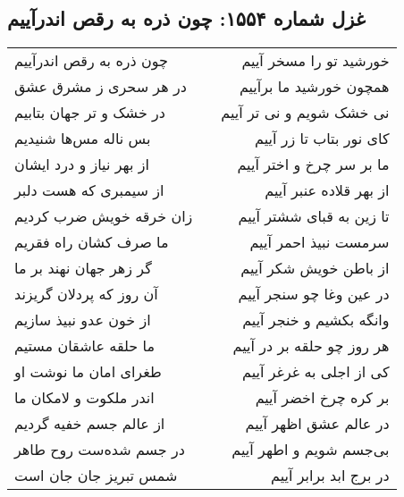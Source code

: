\begin{center}
\section*{غزل شماره ۱۵۵۴: چون ذره به رقص اندرآییم}
\label{sec:1554}
\begin{longtable}{l p{0.5cm} r}
چون ذره به رقص اندرآییم
&&
خورشید تو را مسخر آییم
\\
در هر سحری ز مشرق عشق
&&
همچون خورشید ما برآییم
\\
در خشک و تر جهان بتابیم
&&
نی خشک شویم و نی تر آییم
\\
بس ناله مس‌ها شنیدیم
&&
کای نور بتاب تا زر آییم
\\
از بهر نیاز و درد ایشان
&&
ما بر سر چرخ و اختر آییم
\\
از سیمبری که هست دلبر
&&
از بهر قلاده عنبر آییم
\\
زان خرقه خویش ضرب کردیم
&&
تا زین به قبای ششتر آییم
\\
ما صرف کشان راه فقریم
&&
سرمست نبیذ احمر آییم
\\
گر زهر جهان نهند بر ما
&&
از باطن خویش شکر آییم
\\
آن روز که پردلان گریزند
&&
در عین وغا چو سنجر آییم
\\
از خون عدو نبیذ سازیم
&&
وانگه بکشیم و خنجر آییم
\\
ما حلقه عاشقان مستیم
&&
هر روز چو حلقه بر در آییم
\\
طغرای امان ما نوشت او
&&
کی از اجلی به غرغر آییم
\\
اندر ملکوت و لامکان ما
&&
بر کره چرخ اخضر آییم
\\
از عالم جسم خفیه گردیم
&&
در عالم عشق اظهر آییم
\\
در جسم شده‌ست روح طاهر
&&
بی‌جسم شویم و اطهر آییم
\\
شمس تبریز جان جان است
&&
در برج ابد برابر آییم
\\
\end{longtable}
\end{center}
